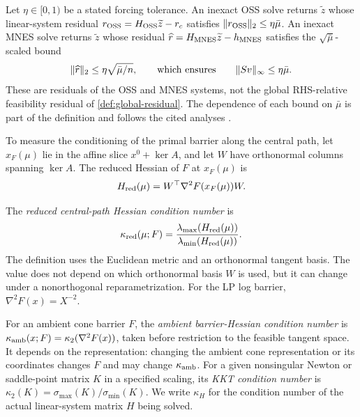 \begin{definition}
\label{def:inexact-newton-residual}
Let $\eta\in[0,1)$ be a stated forcing tolerance.  An inexact OSS solve
returns $\widetilde z$ whose linear-system residual
$r_{\rm OSS}=H_{\rm OSS}\widetilde z-r_c$ satisfies
$\lVert r_{\rm OSS}\rVert_2\leq\eta\bar\mu$.  An inexact MNES solve returns
$\widetilde z$ whose residual
$\widehat r=H_{\rm MNES}\widetilde z-h_{\rm MNES}$ satisfies the
$\sqrt{\bar\mu}$-scaled bound
\begin{equation}
 \lVert\widehat r\rVert_2\leq\eta\sqrt{\bar\mu/n},
 \qquad\text{which ensures}\qquad
 \lVert Sv\rVert_\infty\leq\eta\bar\mu.
 \label{eq:inexact-newton-residual}
\end{equation}
These are residuals of the OSS and MNES systems, not the global
RHS-relative feasibility residual of \cref{def:global-residual}.
The dependence of each bound on $\bar\mu$ is part of the definition and
follows the cited analyses
\cite{mohammadisiahroudi2025-inexact-feasible-interior-point-method,mohammadisiahroudi2024-efficient-use-quantum-linear-system}.
\end{definition}

To measure the conditioning of the primal barrier along the central path,
let $x_F(\mu)$ lie in the affine slice
$x^0+\ker A$, and let $W$ have orthonormal columns spanning $\ker A$.  The
reduced Hessian of $F$ at $x_F(\mu)$ is
\begin{equation}
 H_{\rm red}(\mu)=W^\top\nabla^2F(x_F(\mu))W.
 \label{eq:reduced-hessian}
\end{equation}

\begin{definition}
\label{def:reduced-kappa}
The \emph{reduced central-path Hessian condition number} is
\begin{equation}
 \kappa_{\rm red}(\mu;F)
 =\frac{\lambda_{\max}(H_{\rm red}(\mu))}
        {\lambda_{\min}(H_{\rm red}(\mu))}.
 \label{eq:reduced-kappa}
\end{equation}
The definition uses the Euclidean metric and an orthonormal tangent basis.
The value does not depend on which orthonormal basis $W$ is used, but it can
change under a nonorthogonal reparametrization.
For the LP log barrier, $\nabla^2F(x)=X^{-2}$.
\end{definition}

\begin{definition}
\label{def:ambient-kkt-kappa}
For an ambient cone barrier $F$, the \emph{ambient
barrier-Hessian condition number} is
$\kappa_{\rm amb}(x;F)=\kappa_2(\nabla^2F(x))$, taken before restriction to
the feasible tangent space.  It depends on the representation: changing the
ambient cone representation or its coordinates changes $F$ and may change
$\kappa_{\rm amb}$.  For a given nonsingular Newton or saddle-point matrix $K$
in a specified scaling, its \emph{KKT condition number} is
$\kappa_2(K)=\sigma_{\max}(K)/\sigma_{\min}(K)$.  We write $\kappa_H$ for the
condition number of the actual linear-system matrix $H$ being solved.
\end{definition}

